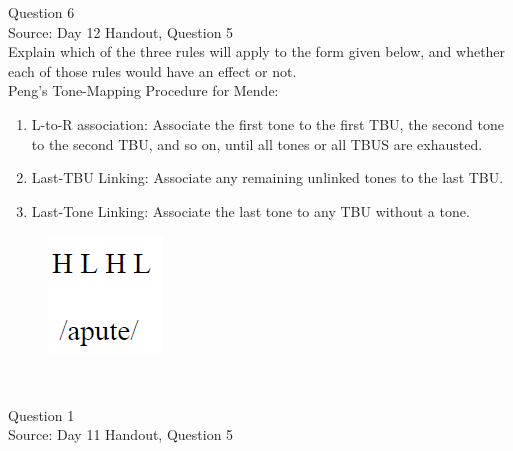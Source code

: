 \documentclass[12pt]{article}
\begin{document}
{\large Question 6}\\

Source: Day 12 Handout, Question 5\\

Explain which of the three rules will apply to the form given below, and whether each of those rules would have an effect or not.\\

Peng’s Tone-Mapping Procedure for Mende: \begin{enumerate} \item L-to-R association: Associate the first tone to the first TBU, the second tone to the second TBU, and so on, until all tones or all TBUS are exhausted. \item Last-TBU Linking: Associate any remaining unlinked tones to the last TBU. \item Last-Tone Linking: Associate the last tone to any TBU without a tone. \end{enumerate}

\begin{figure}[H]
\includegraphics{../images/mendetone_d.png}
\end{figure}

\newpage

\begin{center}
\textbf{{\color{red}{\HUGE END OF EXAM}}}\\

\end{center}
\newpage

\begin{center}
\textbf{{\color{blue}{\HUGE START OF EXAM\\}}}

\textbf{{\color{blue}{\HUGE Student ID: 5824\\}}}

\textbf{{\color{blue}{\HUGE 10:50 - 11:10 AM\\}}}

\end{center}
\newpage

{\large Question 1}\\

Source: Day 11 Handout, Question 5\\
\end{document}
